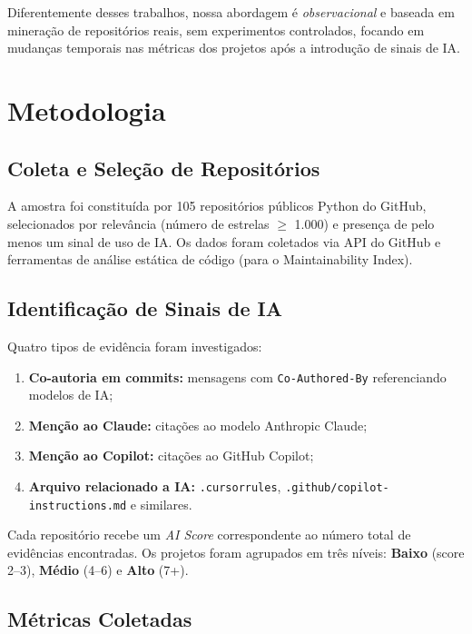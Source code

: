 \documentclass[12pt,a4paper,twocolumn]{article}
\begin{document}
Diferentemente desses trabalhos, nossa abordagem é \textit{observacional} e baseada em
mineração de repositórios reais, sem experimentos controlados, focando em mudanças
temporais nas métricas dos projetos após a introdução de sinais de IA.

\section{Metodologia}

\subsection{Coleta e Seleção de Repositórios}

A amostra foi constituída por 105 repositórios públicos Python do GitHub, selecionados
por relevância (número de estrelas $\geq$ 1.000) e presença de pelo menos um sinal de
uso de IA. Os dados foram coletados via API do GitHub e ferramentas de análise
estática de código (para o Maintainability Index).

\subsection{Identificação de Sinais de IA}

Quatro tipos de evidência foram investigados:

\begin{enumerate}[leftmargin=1.4em, itemsep=1pt]
  \item \textbf{Co-autoria em commits:} mensagens com \texttt{Co-Authored-By}
    referenciando modelos de IA;
  \item \textbf{Menção ao Claude:} citações ao modelo Anthropic Claude;
  \item \textbf{Menção ao Copilot:} citações ao GitHub Copilot;
  \item \textbf{Arquivo relacionado a IA:} \texttt{.cursorrules},
    \texttt{.github/copilot-instructions.md} e similares.
\end{enumerate}

Cada repositório recebe um \textit{AI Score} correspondente ao número total de
evidências encontradas. Os projetos foram agrupados em três níveis: \textbf{Baixo}
(score 2--3), \textbf{Médio} (4--6) e \textbf{Alto} (7+).

\subsection{Métricas Coletadas}
\end{document}
